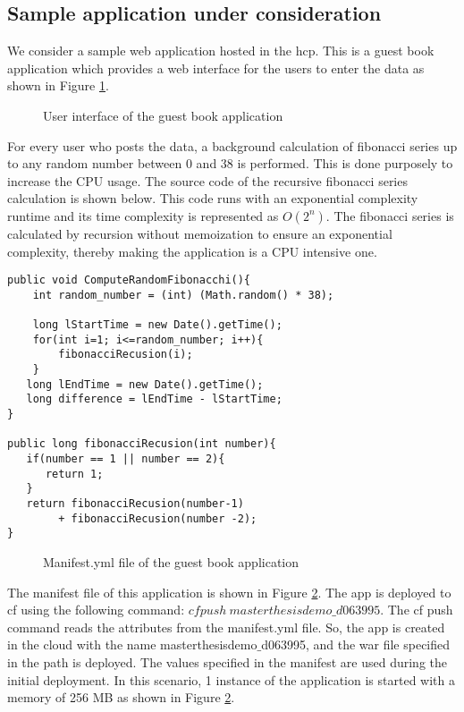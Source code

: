 \documentclass[article,type=msc,colorback,12pt,accentcolor=tud8b,table]{tudthesis}
\begin{document}
	\subsection{Sample application under consideration}
We consider a sample web application hosted in the \gls{hcp}. This is a guest book application which provides a web interface for the users to enter the data as shown in Figure \ref{fig:guestbook_ui}. 
 \begin{figure}[h]
 \begin{center}
  \makebox[\textwidth]{\texttt{[image: E1]}}
\end{center}
\caption{User interface of the guest book application}
\label{fig:guestbook_ui}
\end{figure}
For every user who posts the data, a background calculation of fibonacci series up to any random number between 0 and 38 is performed. This is done purposely to increase the CPU usage. The source code of the recursive fibonacci series calculation is shown below. This code runs with an exponential complexity runtime and its time complexity is represented as $O(2^n)$. The fibonacci series is calculated by recursion without memoization to ensure an exponential complexity, thereby making the application is a CPU intensive one.
 \begin{lstlisting}
public void ComputeRandomFibonacchi(){		
	int random_number = (int) (Math.random() * 38);		
		
	long lStartTime = new Date().getTime();
	for(int i=1; i<=random_number; i++){
		fibonacciRecusion(i);
    }			
   long lEndTime = new Date().getTime();
   long difference = lEndTime - lStartTime;    	
}
		  
public long fibonacciRecusion(int number){
   if(number == 1 || number == 2){
      return 1;
   }
   return fibonacciRecusion(number-1) 
   		+ fibonacciRecusion(number -2); 
}
\end{lstlisting}
 \begin{figure}[H]
 \begin{center}
  \makebox[\textwidth]{\texttt{[image: E2]}}
\end{center}
\caption{Manifest.yml file of the guest book application}
\label{fig:guestbook_manifest}
\end{figure}

The manifest file of this application is shown in Figure \ref{fig:guestbook_manifest}. The app is deployed to \gls{cf} using the following command: $ cf push \: masterthesisdemo\_d063995 $. The cf push command reads the attributes from the manifest.yml file. So, the app is created in the cloud with the name masterthesisdemo$\_$d063995, and the war file specified in the path is deployed. The values specified in the manifest are used during the initial deployment. In this scenario, 1 instance of the application is started with a memory of 256 MB as shown in Figure \ref{fig:guestbook_manifest}.	
	
\end{document}

